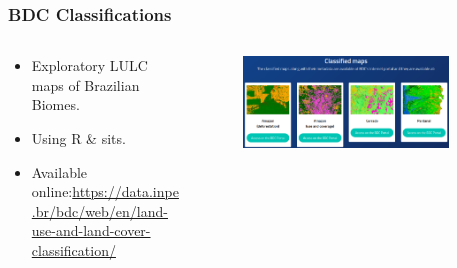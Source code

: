 \documentclass[aspectratio=169]{beamer}
\begin{document}
\begin{frame}
    \frametitle{BDC Classifications}
    \begin{columns}
        \begin{column}{0.5\textwidth}
            \begin{itemize}
                \item Exploratory LULC maps of Brazilian Biomes. 
                \item Using R \& sits.
                \item Available online:\newline \scriptsize{\url{https://data.inpe.br/bdc/web/en/land-use-and-land-cover-classification/}}
            \end{itemize}
        \end{column}
        \begin{column}{0.5\textwidth}
            \begin{figure}
                \centering
                \includegraphics[width=0.9\textwidth]
                {img/brazil_data_cube_classifications.png}
            \end{figure}
        \end{column}
    \end{columns}
\end{frame}
\end{document}
